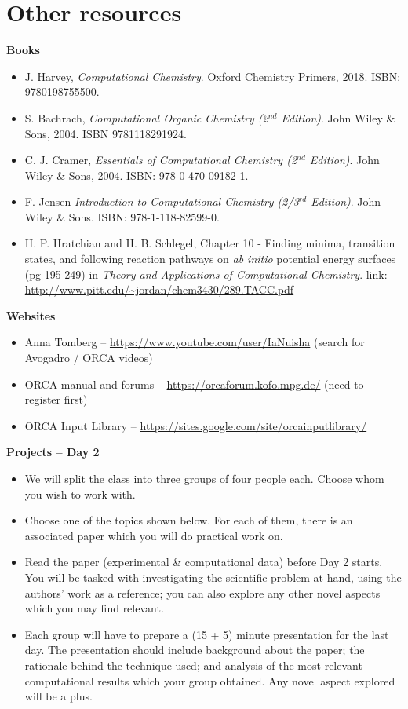 \documentclass[10pt]{article}
\begin{document}
\newpage

\section{Other resources}

\textbf{Books}

\begin{itemize}
    \item J. Harvey, {\it Computational Chemistry}. Oxford Chemistry Primers, 2018. ISBN: 9780198755500.
    \item S. Bachrach, {\it Computational Organic Chemistry (2$^{nd}$ Edition)}. John Wiley \& Sons, 2004. ISBN 9781118291924.
    \item C. J. Cramer, {\it Essentials of Computational Chemistry (2$^{nd}$ Edition)}. John Wiley \& Sons, 2004. ISBN: 978-0-470-09182-1.
    \item F. Jensen {\it Introduction to Computational Chemistry (2/3$^{rd}$ Edition)}. John Wiley \& Sons. ISBN: 978-1-118-82599-0.
    \item H. P. Hratchian and H. B. Schlegel, Chapter 10 - Finding minima, transition states, and following reaction pathways on {\it ab initio} potential energy surfaces (pg 195-249) in {\it Theory and Applications of Computational Chemistry}. link: \url{ http://www.pitt.edu/~jordan/chem3430/289.TACC.pdf}
\end{itemize}

\textbf{Websites}

\begin{itemize}
    \item Anna Tomberg -- \url{https://www.youtube.com/user/IaNuisha} (search for Avogadro / ORCA videos) 
    \item ORCA manual and forums -- \url{https://orcaforum.kofo.mpg.de/} (need to register first)
    \item ORCA Input Library -- \url{https://sites.google.com/site/orcainputlibrary/} 
\end{itemize}

\newpage

\textbf{\LARGE Projects -- Day 2}

\begin{itemize}
   \item We will split the class into three groups of four people each. Choose whom you wish to work with.
    \item Choose one of the topics shown below. For each of them, there is an associated paper which you will do practical work on. 
    \item Read the paper (experimental \& computational data) before Day 2 starts. You will be tasked with investigating the scientific problem at hand, using the authors' work as a reference; you can also explore any other novel aspects which you may find relevant.
    \item Each group will have to prepare a (15 + 5) minute presentation for the last day.  The presentation should include background about the paper; the rationale behind the technique used; and analysis of the most relevant computational results which your group obtained. Any novel aspect explored will be a plus.
\end{itemize}
\end{document}
